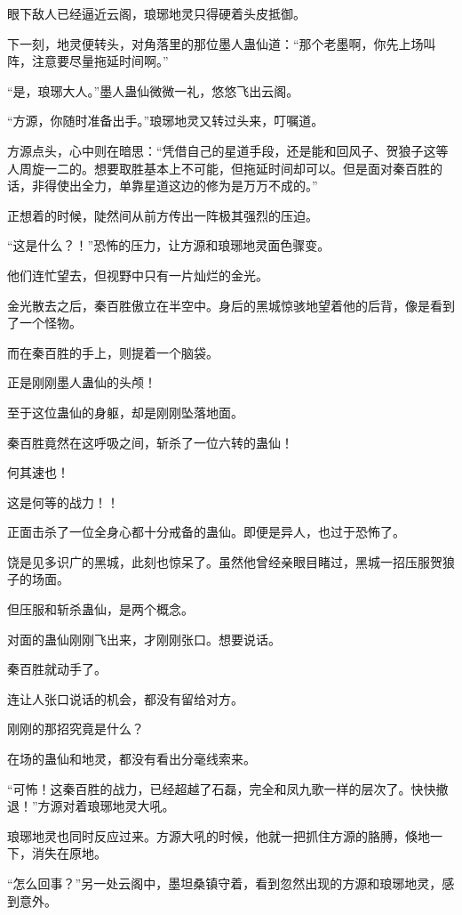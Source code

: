 \begin{this_body}
眼下敌人已经逼近云阁，琅琊地灵只得硬着头皮抵御。

下一刻，地灵便转头，对角落里的那位墨人蛊仙道：“那个老墨啊，你先上场叫阵，注意要尽量拖延时间啊。”

“是，琅琊大人。”墨人蛊仙微微一礼，悠悠飞出云阁。

“方源，你随时准备出手。”琅琊地灵又转过头来，叮嘱道。

方源点头，心中则在暗思：“凭借自己的星道手段，还是能和回风子、贺狼子这等人周旋一二的。想要取胜基本上不可能，但拖延时间却可以。但是面对秦百胜的话，非得使出全力，单靠星道这边的修为是万万不成的。”

正想着的时候，陡然间从前方传出一阵极其强烈的压迫。

“这是什么？！”恐怖的压力，让方源和琅琊地灵面色骤变。

他们连忙望去，但视野中只有一片灿烂的金光。

金光散去之后，秦百胜傲立在半空中。身后的黑城惊骇地望着他的后背，像是看到了一个怪物。

而在秦百胜的手上，则提着一个脑袋。

正是刚刚墨人蛊仙的头颅！

至于这位蛊仙的身躯，却是刚刚坠落地面。

秦百胜竟然在这呼吸之间，斩杀了一位六转的蛊仙！

何其速也！

这是何等的战力！！

正面击杀了一位全身心都十分戒备的蛊仙。即便是异人，也过于恐怖了。

饶是见多识广的黑城，此刻也惊呆了。虽然他曾经亲眼目睹过，黑城一招压服贺狼子的场面。

但压服和斩杀蛊仙，是两个概念。

对面的蛊仙刚刚飞出来，才刚刚张口。想要说话。

秦百胜就动手了。

连让人张口说话的机会，都没有留给对方。

刚刚的那招究竟是什么？

在场的蛊仙和地灵，都没有看出分毫线索来。

“可怖！这秦百胜的战力，已经超越了石磊，完全和凤九歌一样的层次了。快快撤退！”方源对着琅琊地灵大吼。

琅琊地灵也同时反应过来。方源大吼的时候，他就一把抓住方源的胳膊，倏地一下，消失在原地。

“怎么回事？”另一处云阁中，墨坦桑镇守着，看到忽然出现的方源和琅琊地灵，感到意外。


\end{this_body}
